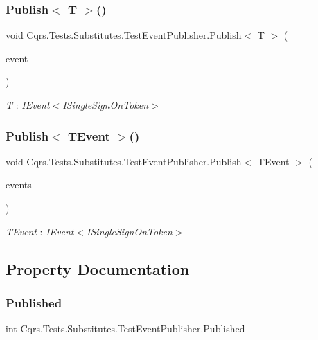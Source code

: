 \subsubsection{\texorpdfstring{Publish$<$ T $>$()}{Publish< T >()}}
{\footnotesize\ttfamily void Cqrs.\+Tests.\+Substitutes.\+Test\+Event\+Publisher.\+Publish$<$ T $>$ (\begin{DoxyParamCaption}\item[{T @}]{event }\end{DoxyParamCaption})}

\begin{Desc}
\item[Type Constraints]\begin{description}
\item[{\em T} : {\em I\+Event$<$I\+Single\+Sign\+On\+Token$>$}]\end{description}
\end{Desc}
\mbox{\label{classCqrs_1_1Tests_1_1Substitutes_1_1TestEventPublisher_adbfefbd0acaa4f7a89344f54871f3943}} 
\subsubsection{\texorpdfstring{Publish$<$ T\+Event $>$()}{Publish< TEvent >()}}
{\footnotesize\ttfamily void Cqrs.\+Tests.\+Substitutes.\+Test\+Event\+Publisher.\+Publish$<$ T\+Event $>$ (\begin{DoxyParamCaption}\item[{I\+Enumerable$<$ T\+Event $>$}]{events }\end{DoxyParamCaption})}

\begin{Desc}
\item[Type Constraints]\begin{description}
\item[{\em T\+Event} : {\em I\+Event$<$I\+Single\+Sign\+On\+Token$>$}]\end{description}
\end{Desc}


\subsection{Property Documentation}
\mbox{\label{classCqrs_1_1Tests_1_1Substitutes_1_1TestEventPublisher_ab4004d3927bdc8133f690b68a81b9d0c}} 
\subsubsection{\texorpdfstring{Published}{Published}}
{\footnotesize\ttfamily int Cqrs.\+Tests.\+Substitutes.\+Test\+Event\+Publisher.\+Published\hspace{0.3cm}{\ttfamily [get]}}

